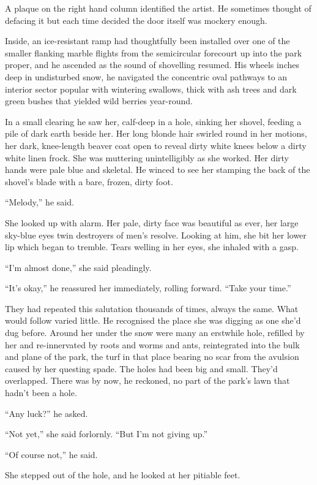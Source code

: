 \documentclass[11pt,a5paper]{article}
\begin{document}
A plaque on the right hand column identified the artist. He sometimes thought of defacing it but each time decided the door itself was mockery enough.

Inside, an ice-resistant ramp had thoughtfully been installed over one of the smaller flanking marble flights from the semicircular forecourt up into the park proper, and he ascended as the sound of shovelling resumed. His wheels inches deep in undisturbed snow, he navigated the concentric oval pathways to an interior sector popular with wintering swallows, thick with ash trees and dark green bushes that yielded wild berries year-round.

In a small clearing he saw her, calf-deep in a hole, sinking her shovel, feeding a pile of dark earth beside her. Her long blonde hair swirled round in her motions, her dark, knee-length beaver coat open to reveal dirty white knees below a dirty white linen frock. She was muttering unintelligibly as she worked. Her dirty hands were pale blue and skeletal. He winced to see her stamping the back of the shovel's blade with a bare, frozen, dirty foot.

``Melody,'' he said.

She looked up with alarm. Her pale, dirty face was beautiful as ever, her large sky-blue eyes twin destroyers of men's resolve. Looking at him, she bit her lower lip which began to tremble. Tears welling in her eyes, she inhaled with a gasp.

``I'm almost done,'' she said pleadingly.

``It's okay,'' he reassured her immediately, rolling forward. ``Take your time.''

They had repeated this salutation thousands of times, always the same. What would follow varied little. He recognised the place she was digging as one she'd dug before. Around her under the snow were many an erstwhile hole, refilled by her and re-innervated by roots and worms and ants, reintegrated into the bulk and plane of the park, the turf in that place bearing no scar from the avulsion caused by her questing spade. The holes had been big and small. They'd overlapped. There was by now, he reckoned, no part of the park's lawn that hadn't been a hole.

``Any luck?'' he asked.

``Not yet,'' she said forlornly. ``But I'm not giving up.''

``Of course not,'' he said.

She stepped out of the hole, and he looked at her pitiable feet.
\end{document}
